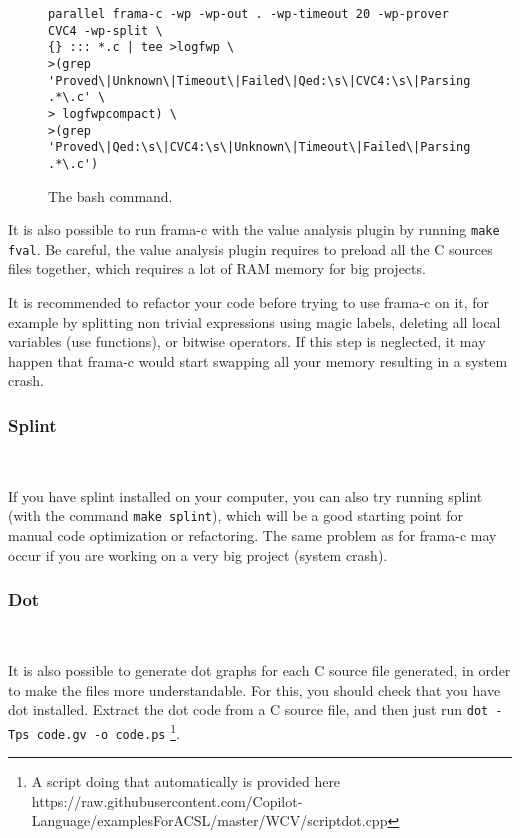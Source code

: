 \begin{figure*}[!htb]
	\begin{lstlisting}[frame=none]
parallel frama-c -wp -wp-out . -wp-timeout 20 -wp-prover CVC4 -wp-split \
{} ::: *.c | tee >logfwp \
>(grep 'Proved\|Unknown\|Timeout\|Failed\|Qed:\s\|CVC4:\s\|Parsing .*\.c' \
> logfwpcompact) \
>(grep 'Proved\|Qed:\s\|CVC4:\s\|Unknown\|Timeout\|Failed\|Parsing .*\.c')

	\end{lstlisting}
	\caption{The bash command.}
	\label{fig:fwp}
\end{figure*} 

It is also possible to run frama-c with the value analysis plugin by running \texttt{make fval}. Be careful, the value analysis plugin requires to preload all the C sources files together, which requires a lot of RAM memory for big projects.

It is recommended to refactor your code before trying to use frama-c on it, for example by splitting non trivial expressions using magic labels, deleting all local variables (use functions), or bitwise operators. If this step is neglected, it may happen that frama-c would start swapping all your memory resulting in a system crash.

\subsubsection{Splint}~\label{subsec:splint} 

If you have splint installed on your computer, you can also try running splint (with the command \texttt{make splint}), which will be a good starting point for manual code optimization or refactoring. The same problem as for frama-c may occur if you are working on a very big project (system crash).

\subsubsection{Dot}~\label{subsec:dot} 

It is also possible to generate dot graphs for each C source file generated, in order to make the files more understandable. For this, you should check that you have dot installed.
Extract the dot code from a C source file, and then just run \texttt{dot -Tps code.gv -o code.ps} \footnote{A script doing that automatically is provided here https://raw.githubusercontent.com/Copilot-Language/examplesForACSL/master/WCV/scriptdot.cpp}.


